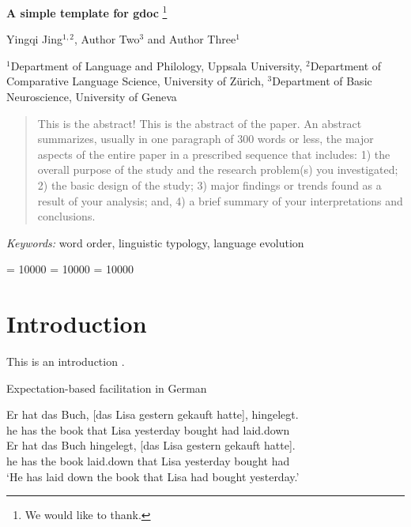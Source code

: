 \documentclass[
]{article}
\providecommand{\keywords}[1]
{\small \textit{Keywords:} #1
}
\begin{document}
\thispagestyle{empty}

\begin{center}
{\doublespacing
{\Large\sffamily\bfseries{A simple template for gdoc}}
\renewcommand*{\thefootnote}{\fnsymbol{footnote}}
\footnote{We would like to thank.}


{\normalsize Yingqi Jing\(^{1,2}\), Author Two\(^3\) and Author Three\(^1\)}

}
{\vspace{\baselineskip}\small \(^1\)Department of Language and Philology, Uppsala University, \(^2\)Department of Comparative Language Science, University of Zürich, \(^3\)Department of Basic Neuroscience, University of Geneva}

\end{center}
\vspace{6pt}


\setcounter{footnote}{0}

\newpage
\begin{abstract}
This is the abstract! This is the abstract of the paper. An abstract
summarizes, usually in one paragraph of 300 words or less, the major
aspects of the entire paper in a prescribed sequence that includes: 1)
the overall purpose of the study and the research problem(s) you
investigated; 2) the basic design of the study; 3) major findings or
trends found as a result of your analysis; and, 4) a brief summary of
your interpretations and conclusions.
\end{abstract}

\setlength\parindent{24pt} \keywords{word order, linguistic typology, language evolution}



\setlength{\parskip}{4pt} \renewcommand{\labelitemi}{-} \clubpenalty =
10000 \widowpenalty = 10000 \displaywidowpenalty = 10000

\let\eachwordone=\itshape
\let\eachwordtwo=\small
\def\gltoffset{0.5ex}

\section{Introduction}\label{introduction}

This is an introduction \autocite{Kemmerer2012}.

\begin{exe} \ex Expectation-based facilitation in German \label{ex-german}
\begin{xlist}
\ex \gll Er hat das Buch, [das Lisa gestern gekauft hatte], hingelegt.\\
         he has the book that Lisa yesterday bought had laid.down\\
\ex  \gll Er hat das Buch hingelegt, [das Lisa gestern gekauft hatte].\\
        he has the book laid.down that Lisa yesterday bought had\\
       \glt ‘He has laid down the book that Lisa had bought yesterday.’ 
\end{xlist}
\end{exe}
\end{document}
